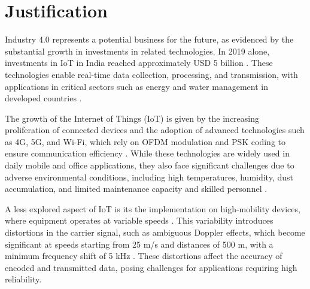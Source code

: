 \section{Justification}

Industry 4.0 represents a potential business for the future, as evidenced by the substantial growth in investments in related technologies. In 2019 alone, investments in IoT in India reached approximately USD 5 billion \cite{iosr2021iot}. These technologies enable real-time data collection, processing, and transmission, with applications in critical sectors such as energy and water management in developed countries \cite{Water40}.

The growth of the Internet of Things (IoT) is given by the increasing proliferation of connected devices and the adoption of advanced technologies such as 4G, 5G, and Wi-Fi, which rely on OFDM modulation and PSK coding to ensure communication efficiency \cite{10729310}. While these technologies are widely used in daily mobile and office applications, they also face significant challenges due to adverse environmental conditions, including high temperatures, humidity, dust accumulation, and limited maintenance capacity and skilled personnel \cite{8519869}.

A less explored aspect of IoT is its the implementation on high-mobility devices, where equipment operates at variable speeds \cite{10152108}. This variability introduces distortions in the carrier signal, such as ambiguous Doppler effects, which become significant at speeds starting from 25 m/s and distances of 500 m, with a minimum frequency shift of 5 kHz \cite{8022917}. These distortions affect the accuracy of encoded and transmitted data, posing challenges for applications requiring high reliability.

